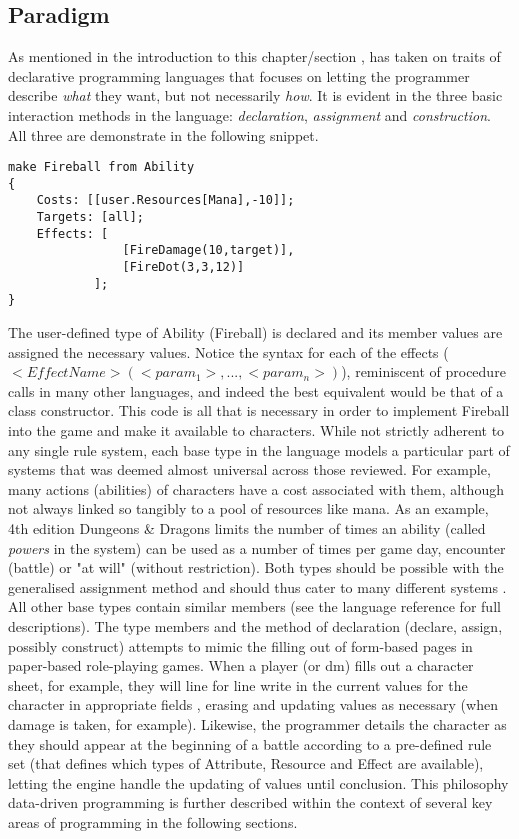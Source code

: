 \subsection{Paradigm}
\label{language:paradigm}
As mentioned in the introduction to this chapter/section , \langname{} has taken on traits of declarative programming languages that focuses on letting the programmer describe \emph{what} they want, but not necessarily \emph{how}. It is evident in the three basic interaction methods in the language: \emph{declaration}, \emph{assignment} and \emph{construction}. All three are demonstrate in the following snippet. 

\begin{lstlisting}[language=fflang]
make Fireball from Ability
{
	Costs: [[user.Resources[Mana],-10]];
	Targets: [all];
	Effects: [
				[FireDamage(10,target)],
				[FireDot(3,3,12)]
			];
}
\end{lstlisting}

The user-defined type of Ability (Fireball) is declared and its member values are assigned the necessary values. Notice the syntax for each of the effects ($<EffectName>(<param_1>,...,<param_n>)$), reminiscent of procedure calls in many other languages, and indeed the best equivalent would be that of a class constructor. This code is all that is necessary in order to implement Fireball into the game and make it available to characters.
While not strictly adherent to any single rule system, each base type in the language models a particular part of systems that was deemed almost universal across those reviewed. For example, many actions (abilities) of characters have a cost associated with them, although not always linked so tangibly to a pool of resources like mana. As an example, 4th edition Dungeons \& Dragons limits the number of times an ability (called \emph{powers} in the system) can be used as a number of times per game day, encounter (battle) or "at will" (without restriction). Both types should be possible with the generalised assignment method and should thus cater to many different systems . All other base types contain similar members (see the language reference for full descriptions).
The type members and the method of declaration (declare, assign, possibly construct) attempts to mimic the filling out of form-based pages in paper-based role-playing games. When a player (or \ac{dm}) fills out a character sheet, for example, they will line for line write in the current values for the character in appropriate fields , erasing and updating values as necessary (when damage is taken, for example). Likewise, the programmer details the character as they should appear at the beginning of a battle according to a pre-defined rule set (that defines which types of Attribute, Resource and Effect are available), letting the engine handle the updating of values until conclusion.
This philosophy data-driven programming is further described within the context of several key areas of programming in the following sections.